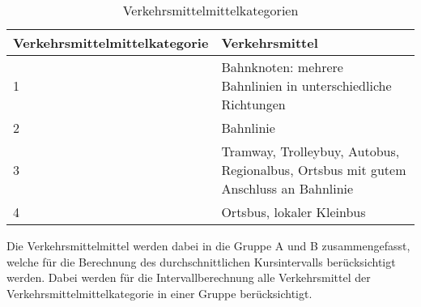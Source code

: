 \begin{table}[ht]
    \begin{tabular}{l p{10.6cm}}
        \toprule
        \textbf{Verkehrsmittelmittelkategorie}
                                & \textbf{Verkehrsmittel}\\
        \midrule
        1
                                & Bahnknoten: mehrere Bahnlinien in unterschiedliche Richtungen\\
        2
                                & Bahnlinie\\
        3
                                & Tramway, Trolleybuy, Autobus, Regionalbus, Ortsbus mit gutem Anschluss an Bahnlinie\\
        4
                                & Ortsbus, lokaler Kleinbus\\
        \bottomrule
    \end{tabular}
    \caption{Verkehrsmittelmittelkategorien}
    \label{table:Verkehrsmittelmittelkategorien}
\end{table}

Die Verkehrsmittelmittel werden dabei in die Gruppe A und B zusammengefasst, welche für die Berechnung des durchschnittlichen Kursintervalls berücksichtigt werden.
Dabei werden für die Intervallberechnung alle Verkehrsmittel der Verkehrsmittelmittelkategorie in einer Gruppe berücksichtigt.

